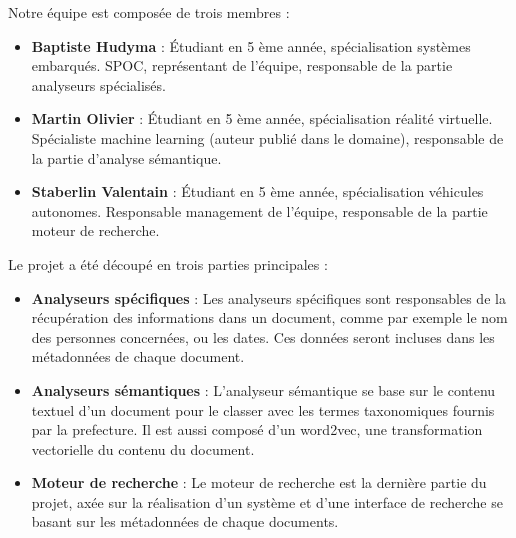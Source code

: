 Notre équipe est composée de trois membres :
\begin {itemize}
\item \textbf {Baptiste Hudyma} :
Étudiant en 5 ème année, spécialisation systèmes embarqués.
SPOC, représentant de l'équipe, responsable de la partie analyseurs spécialisés. 
\\
\item \textbf {Martin Olivier} : 
Étudiant en 5 ème année, spécialisation réalité virtuelle.
Spécialiste machine learning (auteur publié dans le domaine), responsable de la partie d'analyse sémantique.
\\
\item \textbf {Staberlin Valentain} :
Étudiant en 5 ème année, spécialisation véhicules autonomes.
Responsable management de l'équipe, responsable de la partie moteur de recherche.
\\
\end {itemize}


Le projet a été découpé en trois parties principales :
\begin {itemize}
\item \textbf {Analyseurs spécifiques} : 
Les analyseurs spécifiques sont responsables de la récupération des informations dans un document, comme par exemple le nom des personnes concernées, ou les dates.
Ces données seront incluses dans les métadonnées de chaque document.
\\
\item \textbf {Analyseurs sémantiques} :
L'analyseur sémantique se base sur le contenu textuel d'un document pour le classer avec les termes taxonomiques fournis par la prefecture.
Il est aussi composé d'un word2vec, une transformation vectorielle du contenu du document.
\\
\item \textbf {Moteur de recherche} :
Le moteur de recherche est la dernière partie du projet, axée sur la réalisation d'un système et d'une interface de recherche se basant sur les métadonnées de chaque documents.
\\
\end {itemize}
